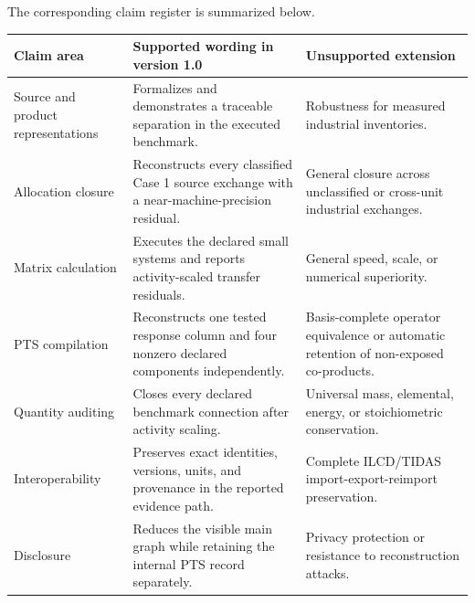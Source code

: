 \documentclass[
  10pt,
  a4paper,
  DIV=11,
  numbers=noendperiod]{scrartcl}
\newcounter{none} %
\begin{document}
The corresponding claim register is summarized below.

{\def\LTcaptype{none} %
\begin{longtable}[]{@{}
  >{\raggedright\arraybackslash}p{}
  >{\raggedright\arraybackslash}p{}
  >{\raggedright\arraybackslash}p{}@{}}
\toprule\noalign{}
\begin{minipage}[b]{\linewidth}\raggedright
Claim area
\end{minipage} & \begin{minipage}[b]{\linewidth}\raggedright
Supported wording in version 1.0
\end{minipage} & \begin{minipage}[b]{\linewidth}\raggedright
Unsupported extension
\end{minipage} \\
\midrule\noalign{}
\endhead
\bottomrule\noalign{}
\endlastfoot
Source and product representations & Formalizes and demonstrates a
traceable separation in the executed benchmark. & Robustness for
measured industrial inventories. \\
Allocation closure & Reconstructs every classified Case 1 source
exchange with a near-machine-precision residual. & General closure
across unclassified or cross-unit industrial exchanges. \\
Matrix calculation & Executes the declared small systems and reports
activity-scaled transfer residuals. & General speed, scale, or numerical
superiority. \\
PTS compilation & Reconstructs one tested response column and four
nonzero declared components independently. & Basis-complete operator
equivalence or automatic retention of non-exposed co-products. \\
Quantity auditing & Closes every declared benchmark connection after
activity scaling. & Universal mass, elemental, energy, or stoichiometric
conservation. \\
Interoperability & Preserves exact identities, versions, units, and
provenance in the reported evidence path. & Complete ILCD/TIDAS
import-export-reimport preservation. \\
Disclosure & Reduces the visible main graph while retaining the internal
PTS record separately. & Privacy protection or resistance to
reconstruction attacks. \\
\end{longtable}
}
\end{document}
